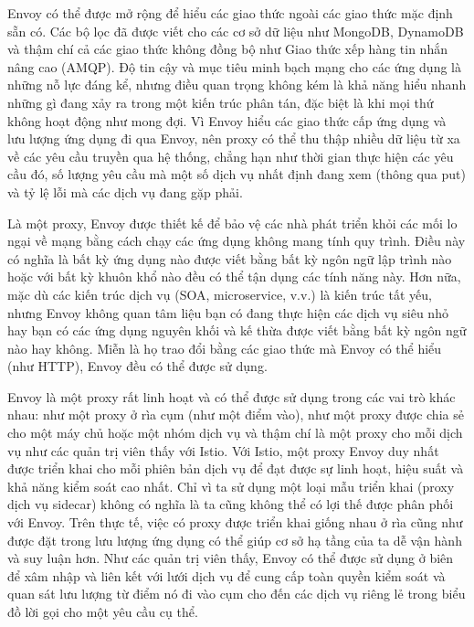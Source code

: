 \documentclass[12pt,a4paper]{report}
\begin{document}
		Envoy có thể được mở rộng để hiểu các giao thức ngoài các giao thức mặc định sẵn có. Các bộ lọc đã được viết cho các cơ sở dữ liệu như MongoDB, DynamoDB và thậm chí cả các giao thức không đồng bộ như Giao thức xếp hàng tin nhắn nâng cao (AMQP). Độ tin cậy và mục tiêu minh bạch mạng cho các ứng dụng là những nỗ lực đáng kể, nhưng điều quan trọng không kém là khả năng hiểu nhanh những gì đang xảy ra trong một kiến trúc phân tán, đặc biệt là khi mọi thứ không hoạt động như mong đợi. Vì Envoy hiểu các giao thức cấp ứng dụng và lưu lượng ứng dụng đi qua Envoy, nên proxy có thể thu thập nhiều dữ liệu từ xa về các yêu cầu truyền qua hệ thống, chẳng hạn như thời gian thực hiện các yêu cầu đó, số lượng yêu cầu mà một số dịch vụ nhất định đang xem (thông qua put) và tỷ lệ lỗi mà các dịch vụ đang gặp phải.
		
		\newpage Là một proxy, Envoy được thiết kế để bảo vệ các nhà phát triển khỏi các mối lo ngại về mạng bằng cách chạy các ứng dụng không mang tính quy trình. Điều này có nghĩa là bất kỳ ứng dụng nào được viết bằng bất kỳ ngôn ngữ lập trình nào hoặc với bất kỳ khuôn khổ nào đều có thể tận dụng các tính năng này. Hơn nữa, mặc dù các kiến trúc dịch vụ (SOA, microservice, v.v.) là kiến trúc tất yếu, nhưng Envoy không quan tâm liệu bạn có đang thực hiện các dịch vụ siêu nhỏ hay bạn có các ứng dụng nguyên khối và kế thừa được viết bằng bất kỳ ngôn ngữ nào hay không. Miễn là họ trao đổi bằng các giao thức mà Envoy có thể hiểu (như HTTP), Envoy đều có thể được sử dụng.
		
		Envoy là một proxy rất linh hoạt và có thể được sử dụng trong các vai trò khác nhau: như một proxy ở rìa cụm (như một điểm vào), như một proxy được chia sẻ cho một máy chủ hoặc một nhóm dịch vụ và thậm chí là một proxy cho mỗi dịch vụ như các quản trị viên thấy với Istio. Với Istio, một proxy Envoy duy nhất được triển khai cho mỗi phiên bản dịch vụ để đạt được sự linh hoạt, hiệu suất và khả năng kiểm soát cao nhất. Chỉ vì ta sử dụng một loại mẫu triển khai (proxy dịch vụ sidecar) không có nghĩa là ta cũng không thể có lợi thế được phân phối với Envoy. Trên thực tế, việc có proxy được triển khai giống nhau ở rìa cũng như được đặt trong lưu lượng ứng dụng có thể giúp cơ sở hạ tầng của ta dễ vận hành và suy luận hơn. Như các quản trị viên thấy, Envoy có thể được sử dụng ở biên để xâm nhập và liên kết với lưới dịch vụ để cung cấp toàn quyền kiểm soát và quan sát lưu lượng từ điểm nó đi vào cụm cho đến các dịch vụ riêng lẻ trong biểu đồ lời gọi cho một yêu cầu cụ thể.
		
\end{document}
